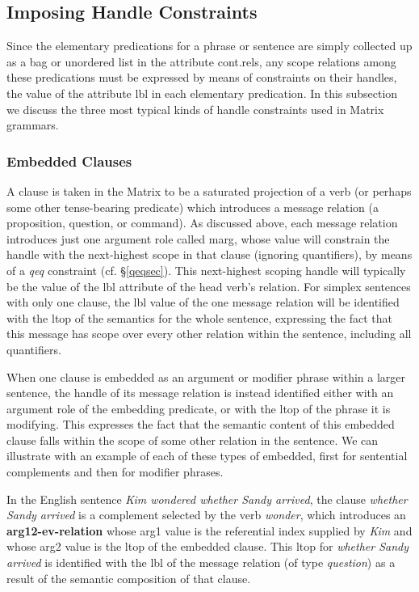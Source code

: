 \documentclass[12pt]{article}
\begin{document}
{\subsection{Imposing Handle Constraints}
\label{hconssec}

Since the elementary predications for a phrase or sentence are simply 
collected up as a bag or unordered list in the attribute {\sc cont.rels},
any scope relations among these predications must be expressed by means of
constraints on their handles, the value of the attribute {\sc lbl} in each
elementary predication.  In this subsection we discuss the three most typical
kinds of handle constraints used in Matrix grammars.

\subsubsection{Embedded Clauses}
\label{msgsec}

A clause is taken in the Matrix to be a saturated projection of a verb (or
perhaps some other tense-bearing predicate) which introduces a message
relation (a proposition, question, or command).  As discussed above, each
message relation introduces just one argument role called {\sc marg}, whose
value will constrain the handle with the next-highest scope in that clause
(ignoring quantifiers), by means of a {\it qeq} constraint 
(cf. \S\ref{qeqsec}). 
This next-highest scoping handle will typically be the value of the {\sc lbl}
attribute of the head verb's relation.  For simplex sentences with only one
clause, the {\sc lbl} value of the one message relation will be identified
with the {\sc ltop} of the semantics for the whole sentence, expressing the
fact that this message has scope over every other relation within the
sentence, including all quantifiers.

When one clause is embedded as an argument or modifier phrase within a larger
sentence, the handle of its message relation is instead identified either with 
an argument role of the embedding predicate, or with the {\sc ltop} of the
phrase it is modifying.  This expresses the fact that the semantic content
of this embedded clause falls within the scope of some other relation in the
sentence.  We can illustrate with an example of each of these types of
embedded, first for sentential complements and then for modifier phrases.

In the English sentence {\it Kim wondered whether Sandy arrived}, the clause
{\it whether Sandy arrived} is a complement selected by the verb {\it wonder},
which introduces an {\bf arg12-ev-relation} whose {\sc arg1} value is the
referential index supplied by {\it Kim} and whose {\sc arg2} value is the
{\sc ltop} of the embedded clause.  This {\sc ltop} for {\it whether Sandy
arrived} is identified with the {\sc lbl} of the message relation (of type
{\it question}) as a result of the semantic composition of that clause.

}
\end{document}
